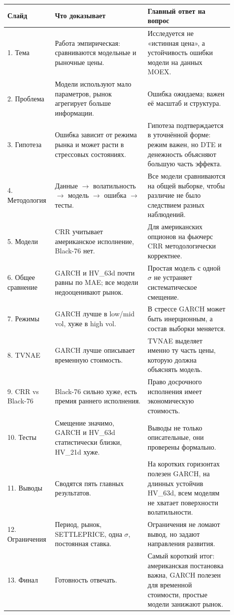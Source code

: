 \documentclass[11pt,a4paper]{article}
\begin{document}
\begin{longtable}{p{0.16\linewidth}p{0.39\linewidth}p{0.36\linewidth}}
\toprule
\textbf{Слайд} & \textbf{Что доказывает} & \textbf{Главный ответ на вопрос} \\
\midrule
1. Тема & Работа эмпирическая: сравниваются модельные и рыночные цены. & Исследуется не «истинная цена», а устойчивость ошибки модели на данных MOEX. \\
2. Проблема & Модели используют мало параметров, рынок агрегирует больше информации. & Ошибка ожидаема; важен её масштаб и структура. \\
3. Гипотеза & Ошибка зависит от режима рынка и может расти в стрессовых состояниях. & Гипотеза подтверждается в уточнённой форме: режим важен, но DTE и денежность объясняют большую часть эффекта. \\
4. Методология & Данные $\rightarrow$ волатильность $\rightarrow$ модель $\rightarrow$ ошибка $\rightarrow$ тесты. & Все модели сравниваются на общей выборке, чтобы различие не было следствием разных наблюдений. \\
5. Модели & CRR учитывает американское исполнение, Black-76 нет. & Для американских опционов на фьючерс CRR методологически корректнее. \\
6. Общее сравнение & GARCH и HV\_63d почти равны по MAE; все модели недооценивают рынок. & Простая модель с одной $\sigma$ не устраняет систематическое смещение. \\
7. Режимы & GARCH лучше в low/mid vol, хуже в high vol. & В стрессе GARCH может быть инерционным, а состав выборки меняется. \\
8. TVNAE & GARCH лучше описывает временную стоимость. & TVNAE выделяет именно ту часть цены, которую должна объяснять модель. \\
9. CRR vs Black-76 & Black-76 сильно хуже, есть премия раннего исполнения. & Право досрочного исполнения имеет экономическую стоимость. \\
10. Тесты & Смещение значимо, GARCH и HV\_63d статистически близки, HV\_21d хуже. & Выводы не только описательные, они проверены формально. \\
11. Выводы & Сводятся пять главных результатов. & На коротких горизонтах полезен GARCH, на длинных устойчив HV\_63d, всем моделям не хватает поверхности волатильности. \\
12. Ограничения & Период, рынок, SETTLEPRICE, одна $\sigma$, постоянная ставка. & Ограничения не ломают вывод, но задают направления развития. \\
13. Финал & Готовность отвечать. & Самый короткий итог: американская постановка важна, GARCH полезен для временной стоимости, простые модели занижают рынок. \\
\bottomrule
\end{longtable}
\end{document}
